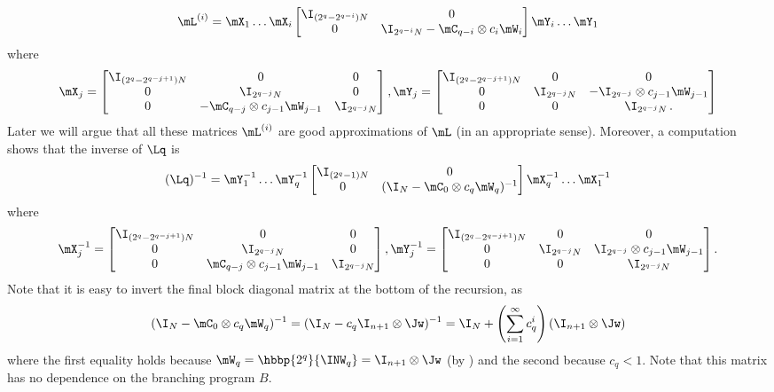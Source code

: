 \documentclass{toc}
\begin{document}
\begin{equation}
    \mL^{(i)}=\mX_1\dots \mX_i\begin{bmatrix}\I_{(2^q-2^{q-i})N} & 0\\ 0 & \I_{2^{q-i}N}-\mC_{q-i}\otimes c_i\mW_i\end{bmatrix}\mY_i\dots \mY_1 \label{eqn:Lq}%
\end{equation}
%
where %
\[\mX_j=\begin{bmatrix} \I_{(2^q-2^{q-j+1})N} & 0 & 0\\
0 & \I_{2^{q-j}N} & 0\\
0 & -\mC_{q-j}\otimes c_{j-1}\mW_{j-1} & \I_{2^{q-j}N}
\end{bmatrix},\\
\mY_j=\begin{bmatrix} \I_{(2^q-2^{q-j+1})N} & 0 & 0\\
0 & \I_{2^{q-j}N} & -\I_{2^{q-j}}\otimes c_{j-1}\mW_{j-1}\\
0 & 0 & \I_{2^{q-j}N}\,. %
\end{bmatrix}\]
Later we will argue that all these matrices $\mL^{(i)}$%
are good approximations of $\mL$ (in an appropriate sense). Moreover, 
a computation shows that the inverse of $\Lq$ is
%
\begin{equation}\label{eqn:Lqinv}
    (\Lq)^{-1} = \mY_1^{-1}\dots \mY_q^{-1}\begin{bmatrix}\I_{(2^q-1)N} & 0\\ 0 & (\I_{N}-\mC_{0}\otimes c_q \mW_q)^{-1}\end{bmatrix}\mX_q^{-1}\dots \mX_1^{-1}%
\end{equation}
%
where %
\[\mX_j^{-1}=\begin{bmatrix} \I_{(2^q-2^{q-j+1})N} & 0 & 0\\
0 & \I_{2^{q-j}N} & 0\\
0 & \mC_{q-j}\otimes c_{j-1}\mW_{j-1} & \I_{2^{q-j}N}
\end{bmatrix}, 
\mY_j^{-1}=\begin{bmatrix} \I_{(2^q-2^{q-j+1})N} & 0 & 0\\
0 & \I_{2^{q-j}N} & \I_{2^{q-j}}\otimes c_{j-1}\mW_{j-1}\\
0 & 0 & \I_{2^{q-j}N}
\end{bmatrix}.\]
Note that it is easy to invert the final block diagonal matrix at the bottom of the recursion, as
$$(\I_{N}-\mC_{0}\otimes c_q \mW_q)^{-1}=(\I_N-c_q\I_{n+1}\otimes \Jw)^{-1}=\I_N+\left(\sum_{i=1}^\infty c_q^i\right)(\I_{n+1}\otimes \Jw)$$ 
where the first equality holds because $\mW_q = \hbbp{2^q}{\INW_q}=\I_{n+1}\otimes\Jw$ (by ) and the second because $c_q<1$. Note that this matrix has no dependence on the branching program $B$.
\end{document}
